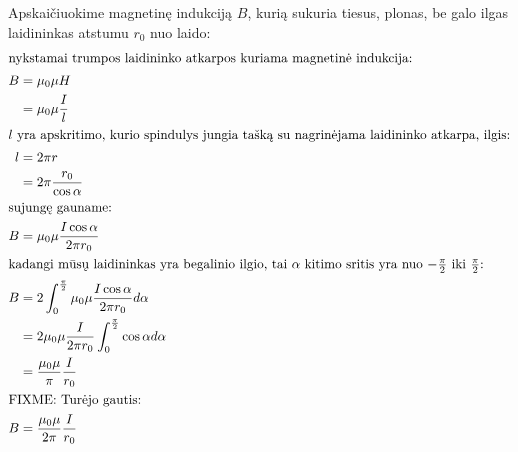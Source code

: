 \begin{exmp}
  Apskaičiuokime magnetinę indukciją $B$, kurią sukuria tiesus, plonas,
  be galo ilgas laidininkas atstumu $r_{0}$ nuo laido:
  \begin{align*}
    \intertext{nykstamai trumpos laidininko atkarpos kuriama magnetinė
    indukcija:}  
    B
    &= \mu_{0} \mu H \\
    &= \mu_{0} \mu \frac{I}{l} \\
    \intertext{$l$ yra apskritimo, kurio spindulys jungia tašką su 
    nagrinėjama laidininko atkarpa, ilgis:}
    l
    &= 2 \pi r \\
    &= 2 \pi \frac{r_{0}}{\cos \alpha} \\
    \intertext{sujungę gauname:}
    B
    &= \mu_{0} \mu \frac{I \cos \alpha}{2 \pi r_{0}} \\
    \intertext{kadangi mūsų laidininkas yra begalinio ilgio, tai
    $\alpha$ kitimo sritis yra nuo $-\frac{\pi}{2}$ iki $\frac{\pi}{2}$:}
    B
    &= 2 \int _{0} ^{\frac{\pi}{2}} \mu_{0} \mu 
      \frac{I \cos \alpha}{2 \pi r_{0}} d \alpha \\
    &= 2 \mu_{0} \mu \frac{I}{2 \pi r_{0}}
      \int _{0} ^{\frac{\pi}{2}} \cos \alpha d\alpha \\
    &= \frac{\mu_{0} \mu}{\pi} \frac{I}{r_{0}}\\
    \intertext{FIXME: Turėjo gautis:}
    B &= \frac{\mu_{0} \mu}{2 \pi} \frac{I}{r_{0}}
  \end{align*}
\end{exmp}
